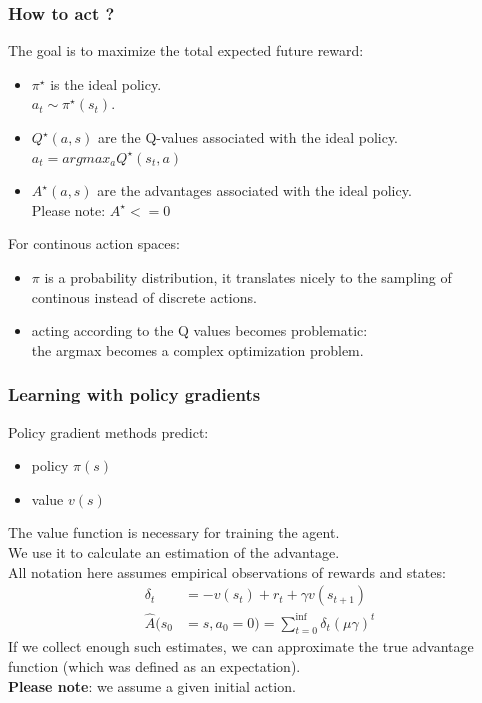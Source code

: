 \documentclass{beamer}
\begin{document}
\begin{frame}
\frametitle{How to act ?}
The goal is to maximize the total expected future reward:
\begin{itemize}
\item \(\pi^\star\) is the ideal policy. \\
\hspace{0.3cm} \textrightarrow  \hspace{0.3cm} \(a_t \sim \pi^\star(s_t)\). 
\item \(Q^\star(a, s)\) are the Q-values associated with the ideal policy.\\
\hspace{0.3cm} \textrightarrow  \hspace{0.3cm} \(a_t = argmax_a Q^\star(s_t, a)\)
\item \(A^\star(a, s)\) are the advantages associated with the ideal policy. \\
Please note: \(A^\star <= 0\)
\end{itemize}
\bigskip

For continous action spaces:
\begin{itemize}
\item \(\pi\) is a probability distribution, it translates nicely to the sampling of continous instead of discrete actions.
\item acting according to the Q values becomes problematic:\\
\hspace{0.3cm} \textrightarrow  \hspace{0.3cm} the argmax becomes a complex optimization problem.
\end{itemize}
\end{frame}

\begin{frame}
\frametitle{Learning with policy gradients}
Policy gradient methods predict:
\begin{itemize}
\item policy \(\pi(s)\)
\item value \(v(s)\)
\end{itemize}
The value function is necessary for training the agent. \\
We use it to calculate an estimation of the advantage. \\
All notation here assumes empirical observations of rewards and states:
\begin{align*}
\delta_t &= -v(s_t) + r_t + \gamma  v(s_{t+1}) \\
\hat{A}(s_0 &=s, a_0 =0) = \sum_{t=0}^{\inf} \delta_t (\mu \gamma) ^t
\end{align*}
If we collect enough such estimates, we can approximate the true advantage function (which was defined as an expectation).\\
\textbf{Please note}: we assume a given initial action.
\end{frame}
\end{document}
